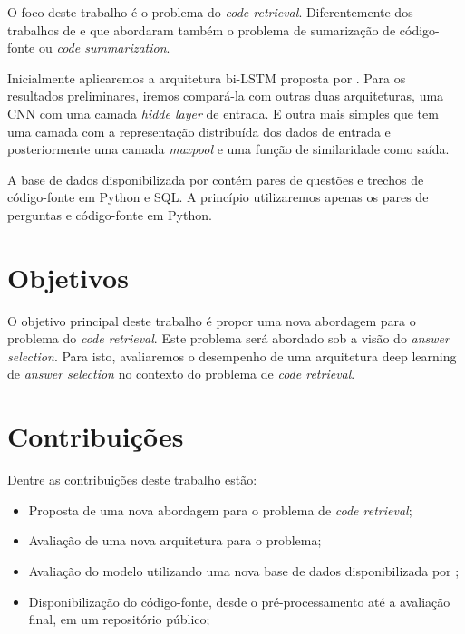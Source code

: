 O foco deste trabalho é o problema do \textit{code retrieval}. Diferentemente dos trabalhos de \cite{iyer-etal-2016-summarizing} e \cite{Allamanis-bimodal-source-code-natural-language:2015} que abordaram também o problema de sumarização de código-fonte ou \textit{code summarization}. 

Inicialmente aplicaremos a arquitetura bi-LSTM proposta por \cite{tan-lstm-qa}. Para os resultados preliminares, iremos compará-la com outras duas arquiteturas, uma CNN com uma camada \textit{hidde layer} de entrada. E outra mais simples que tem uma camada com a representação distribuída dos dados de entrada e posteriormente uma camada \textit{maxpool} e uma função de similaridade como saída.

A base de dados disponibilizada por \cite{yao-2018} contém pares de questões e trechos de código-fonte em Python e SQL. A princípio utilizaremos apenas os pares de perguntas e código-fonte em Python.


\section{Objetivos}
\label{sec:objetivo}

O objetivo principal deste trabalho é propor uma nova abordagem para o problema do \textit{code retrieval}. Este problema será abordado sob a visão do \textit{answer selection}. Para isto, avaliaremos o desempenho de uma arquitetura deep learning de \textit{answer selection} no contexto do problema de \textit{code retrieval}.

\section{Contribuições}
\label{sec:contribucoes}

Dentre as contribuições deste trabalho estão:

\begin{itemize}
\item Proposta de uma nova abordagem para o problema de \textit{code retrieval};
\item Avaliação de uma nova arquitetura para o problema;
\item Avaliação do modelo utilizando uma nova base de dados disponibilizada por \cite{yao-2018};
\item Disponibilização do código-fonte, desde o pré-processamento até a avaliação final, em um repositório público;
\end{itemize}

